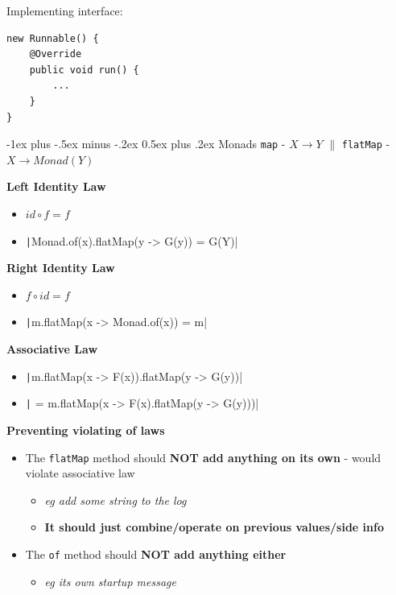 \documentclass[10pt, landscape]{article}
\makeatletter
\renewcommand{\section}{\@startsection{section}{1}{0mm}%
                                {-1ex plus -.5ex minus -.2ex}%
                                {0.5ex plus .2ex}%
                                {\normalfont\large\bfseries}}
\newcommand{\code}[1]{\textcolor{mygreen}{\texttt{#1}}}
\newcommand{\java}[1]{\texttt|#1|}
\makeatother
\begin{document}
\begin{multicols}{2}
\begin{multicols}{2}
Implementing interface:
\begin{verbatim}
new Runnable() {
    @Override
    public void run() {
        ...
    }
}
\end{verbatim}
\end{multicols}

\section{Monads}
\code{map} - $X \to Y$ $\|$ \code{flatMap} - $X \to Monad(Y)$ \\
\vspace{3 pt}

\textbf{Left Identity Law}
\begin{itemize}
    \item $id \circ f=f$
    \item \java{Monad.of(x).flatMap(y -> G(y)) = G(Y)}
\end{itemize}
\textbf{Right Identity Law}
\begin{itemize}
    \item $f \circ id = f$
    \item \java{m.flatMap(x -> Monad.of(x)) = m}
\end{itemize}
\textbf{Associative Law}
\begin{itemize}
    \item \java{m.flatMap(x -> F(x)).flatMap(y -> G(y))} 
    \item \java{ = m.flatMap(x -> F(x).flatMap(y -> G(y)))}
\end{itemize}
\vspace{3 pt}
\textbf{Preventing violating of laws}
\begin{itemize}
    \item The \code{flatMap} method should \textbf{NOT add anything on its own} - would violate associative law
    \begin{itemize}
        \item \textit{eg add some string to the log}
        \item \textbf{It should just combine/operate on previous values/side info}
    \end{itemize}
    \item The \code{of} method should \textbf{NOT add anything either}
    \begin{itemize}
        \item \textit{eg its own startup message}
    \end{itemize}
\end{itemize}



\end{multicols}
\end{document}
